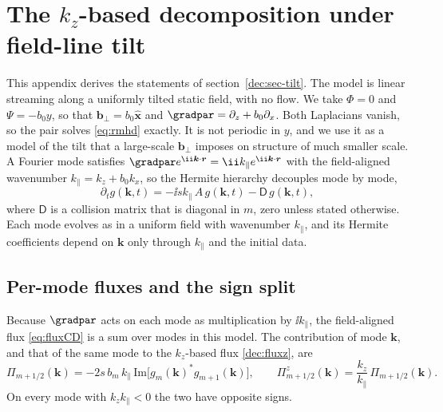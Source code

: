 \section{The \texorpdfstring{$k_z$}{kz}-based decomposition under field-line tilt}\label{app:tilt}

This appendix derives the statements of section~\ref{dec:sec-tilt}. The model is linear streaming along a uniformly tilted static field, with no flow. We take $\Phi=0$ and $\Psi=-b_0y$, so that $\boldsymbol b_\perp=b_0\hat{\boldsymbol x}$ and $\gradpar=\partial_z+b_0\partial_x$. Both Laplacians vanish, so the pair solves \eqref{eq:rmhd} exactly. It is not periodic in $y$, and we use it as a model of the tilt that a large-scale $\boldsymbol b_\perp$ imposes on structure of much smaller scale. A Fourier mode satisfies $\gradpar e^{\ii\boldsymbol k\cdot\boldsymbol r}=\ii k_\parallel e^{\ii\boldsymbol k\cdot\boldsymbol r}$ with the field-aligned wavenumber $k_\parallel=k_z+b_0k_x$, so the Hermite hierarchy decouples mode by mode,
\begin{equation}\label{appE:mode}
  \partial_tg(\boldsymbol k,t)=-\ii sk_\parallel\,A\,g(\boldsymbol k,t)-\mathsf D\,g(\boldsymbol k,t),
\end{equation}
where $\mathsf D$ is a collision matrix that is diagonal in $m$, zero unless stated otherwise. Each mode evolves as in a uniform field with wavenumber $k_\parallel$, and its Hermite coefficients depend on $\boldsymbol k$ only through $k_\parallel$ and the initial data.

\subsection{Per-mode fluxes and the sign split}\label{appE:sec-permode}

Because $\gradpar$ acts on each mode as multiplication by $\ii k_\parallel$, the field-aligned flux \eqref{eq:fluxCD} is a sum over modes in this model. The contribution of mode $\boldsymbol k$, and that of the same mode to the $k_z$-based flux \eqref{dec:fluxz}, are
\begin{equation}\label{appE:permode}
  \Pi_{m+1/2}(\boldsymbol k)=-2s\,b_m\,k_\parallel\,\mathrm{Im}\big[g_m(\boldsymbol k)^*g_{m+1}(\boldsymbol k)\big],\qquad
  \Pi^z_{m+1/2}(\boldsymbol k)=\frac{k_z}{k_\parallel}\,\Pi_{m+1/2}(\boldsymbol k).
\end{equation}
On every mode with $k_zk_\parallel<0$ the two have opposite signs.

